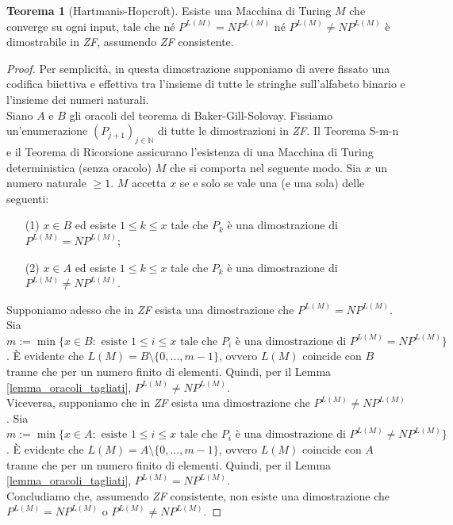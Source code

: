 \documentclass[12pt,a4paper]{report}
\theoremstyle{definition}
\newtheorem{teo}{Teorema}[section]  %
\begin{document}
\begin{teo}[Hartmanis-Hopcroft]
Esiste una Macchina di Turing $M$ che converge su ogni input, tale che né $P^{L(M)}=NP^{L(M)}$ né $P^{L(M)} \neq NP^{L(M)}$ è dimostrabile in \emph{ZF}, assumendo \emph{ZF} consistente.
\begin{proof}
Per semplicità, in questa dimostrazione supponiamo di avere fissato una codifica biiettiva e effettiva tra l'insieme di tutte le stringhe sull'alfabeto binario e l'insieme dei numeri naturali.\\
Siano $A$ e $B$ gli oracoli del teorema di Baker-Gill-Solovay. Fissiamo un'enumerazione $(P_{j+1})_{j \in \mathbb{N}}$ di tutte le dimostrazioni in \emph{ZF}. Il Teorema S-m-n e il Teorema di Ricorsione assicurano l'esistenza di una Macchina di Turing deterministica (senza oracolo) $M$ che si comporta nel seguente modo. Sia $x$ un numero naturale $\geq 1$. $M$ accetta $x$ se e solo se vale una (e una sola) delle seguenti:
\begin{enumerate}
\item[(1)] $x \in B$ ed esiste $1 \leq k \leq x$ tale che $P_k$ è una dimostrazione di $P^{L(M)}=NP^{L(M)}$;
\item[(2)] $x \in A$ ed esiste $1 \leq k \leq x$ tale che $P_k$ è una dimostrazione di $P^{L(M)} \neq NP^{L(M)}$.
\end{enumerate}
Supponiamo adesso che in \emph{ZF} esista una dimostrazione che $P^{L(M)}=NP^{L(M)}$. Sia $m:=\min \{x \in B: \text{ esiste } 1 \leq i \leq x \text{ tale che } P_i \text{ è una dimostrazione di } P^{L(M)}=NP^{L(M)}\}$. È evidente che $L(M)=B \setminus \{0,...,m-1\}$, ovvero $L(M)$ coincide con $B$ tranne che per un numero finito di elementi. Quindi, per il Lemma \ref{lemma_oracoli_tagliati}, $P^{L(M)} \neq NP^{L(M)}$.\\
Viceversa, supponiamo che in \emph{ZF} esista una dimostrazione che $P^{L(M)} \neq NP^{L(M)}$. Sia $m:=\min \{x \in A:  \text{ esiste } 1 \leq i \leq x \text{ tale che } P_i \text{ è una dimostrazione di } P^{L(M)} \neq NP^{L(M)}\}$. È evidente che $L(M)=A \setminus \{0,...,m-1\}$, ovvero $L(M)$ coincide con $A$ tranne che per un numero finito di elementi. Quindi, per il Lemma \ref{lemma_oracoli_tagliati}, $P^{L(M)}=NP^{L(M)}$.\\
Concludiamo che, assumendo \emph{ZF} consistente, non esiste una dimostrazione che $P^{L(M)}=NP^{L(M)}$ o $P^{L(M)} \neq NP^{L(M)}$.
\end{proof}
\end{teo}
\end{document}
